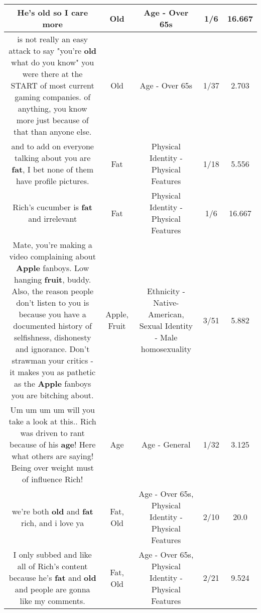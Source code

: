 \documentclass[11pt]{article}
\newlength\mylength
\begin{document}
\begin{center}
\begin{longtable}{|C{.65\mylength}|C{.30\mylength}|C{.12\mylength}|C{.12\mylength}|C{.12\mylength}|}
  \small He's \textbf{old} so I care more\normalsize   & Old & Age - Over 65s & 1/6 & 16.667 \\  \hline
  \small is not really an easy attack to say "you're \textbf{old} what do you know" you were there at the START of most current gaming companies. of anything, you know more just because of that than anyone else.\normalsize   & Old & Age - Over 65s & 1/37 & 2.703 \\  \hline
  \small and to add on everyone talking about you are \textbf{fat}, I bet none of them have profile pictures.\normalsize   & Fat & Physical Identity - Physical Features & 1/18 & 5.556 \\  \hline
  \small Rich's cucumber is \textbf{fat} and irrelevant\normalsize   & Fat & Physical Identity - Physical Features & 1/6 & 16.667 \\  \hline
  \small Mate, you're making a video complaining about \textbf{Apple} fanboys. Low hanging \textbf{fruit}, buddy. Also, the reason people don't listen to you is because you have a documented history of selfishness, dishonesty and ignorance. Don't strawman your critics - it makes you as pathetic as the \textbf{Apple} fanboys you are bitching about.\normalsize   & Apple, Fruit & Ethnicity - Native-American, Sexual Identity - Male homosexuality & 3/51 & 5.882 \\  \hline
  \small Um um um um will you take a look at this.. Rich was driven to rant because of his \textbf{age}! Here what others are saying! Being over weight must of influence Rich!\normalsize   & Age & Age - General & 1/32 & 3.125 \\  \hline
  \small we're both \textbf{old} and \textbf{fat} rich, and i love ya\normalsize   & Fat, Old & Age - Over 65s, Physical Identity - Physical Features & 2/10 & 20.0 \\  \hline
  \small I only subbed and like all of Rich's content because he's \textbf{fat} and \textbf{old} and people are gonna like my comments.\normalsize   & Fat, Old & Age - Over 65s, Physical Identity - Physical Features & 2/21 & 9.524 \\  \hline

\end{longtable}
\end{center}
\end{document}
